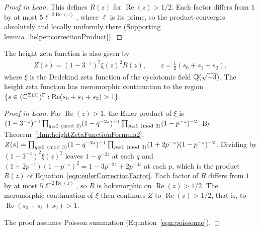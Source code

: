 \begin{proof}[Proof in Lean]

\leanok


This defines $R(z)$ for $\operatorname{Re}(z)>1/2$. Each factor differs from $1$ by at most $5\ell^{-2\operatorname{Re}(z)}$, where $\ell$ is its prime, so the product converges absolutely and locally uniformly there (Supporting lemma~\ref{helper:correctionProduct}).

\end{proof}

\begin{lemma}

\label{lemma:simplifiedZ-s}


\leanok



 The height zeta function is also given by \begin{align*} Z(s)=\left(1-3^{-z}\right)^2\xi(z)^2R(z),\qquad z=\tfrac12(s_0+s_1+s_2), \end{align*} where $\xi$ is the Dedekind zeta function of the cyclotomic field $\mathbb{Q}(\sqrt{-3})$. The height zeta function has meromorphic continuation to the region $\{s \in (\mathbb{C}^{\Sigma(1)})^{\Gamma} : \mathrm{Re}(s_0+s_1+s_2) > 1\}$. 

\end{lemma}

\begin{proof}[Proof in Lean]

\leanok


For $\operatorname{Re}(z)>1$, the Euler product of $\xi$ is $(1-3^{-z})^{-1}\prod_{q\equiv2\ (\mathrm{mod}\ 3)}(1-q^{-2z})^{-1}\prod_{p\equiv1\ (\mathrm{mod}\ 3)}(1-p^{-z})^{-2}$. By Theorem~\ref{thm:heightZetaFunctionFormula2}, $Z(s)=\prod_{q\equiv2\ (\mathrm{mod}\ 3)}(1-q^{-2z})^{-1}\prod_{p\equiv1\ (\mathrm{mod}\ 3)}(1+2p^{-z})(1-p^{-z})^{-2}$. Dividing by $(1-3^{-z})^2\xi(z)^2$ leaves $1-q^{-2z}$ at each $q$ and $(1+2p^{-z})(1-p^{-z})^2=1-3p^{-2z}+2p^{-3z}$ at each $p$, which is the product $R(z)$ of Equation~\ref{eqn:eulerCorrectionFactor}. Each factor of $R$ differs from $1$ by at most $5\ell^{-2\operatorname{Re}(z)}$, so $R$ is holomorphic on $\operatorname{Re}(z)>1/2$. The meromorphic continuation of $\xi$ then continues $Z$ to $\operatorname{Re}(z)>1/2$, that is, to $\operatorname{Re}(s_0+s_1+s_2)>1$.

The proof assumes Poisson summation (Equation~\ref{eqn:poissonae}).

\end{proof}

